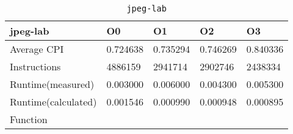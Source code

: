 \begin{table}[ht!]
\centering
\caption{\texttt{jpeg-lab}}
\label{tab:jpeg-lab}
\begin{tabular}{|l|l|l|l|l|}
\hline
\textbf{jpeg-lab}	&	\textbf{O0}	&	\textbf{O1}	&	\textbf{O2}	&	\textbf{O3}	\\\hline\hline
Average CPI	&	0.724638	&	0.735294	&	0.746269	&	0.840336	\\\hline
Instructions	&	4886159	&	2941714	&	2902746	&	2438334	\\\hline
Runtime(measured)	&	0.003000	&	0.006000	&	0.004300	&	0.005300	\\\hline
Runtime(calculated)	&	0.001546	&	0.000990	&	0.000948	&	0.000895	\\\hline
Function	&		&		&		&		\\\hline
\end{tabular}
\end{table}
